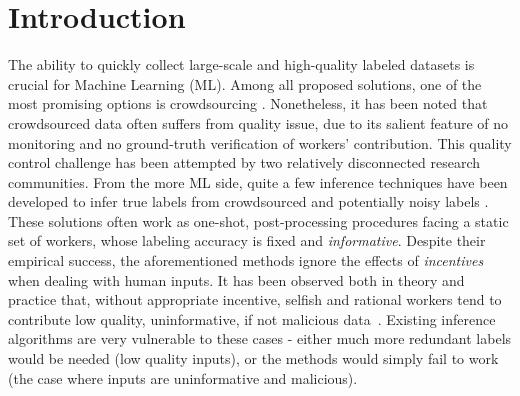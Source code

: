 \documentclass{article}
\begin{document}
\section{Introduction}
The ability to quickly collect large-scale and high-quality labeled datasets is crucial for Machine Learning (ML). Among all proposed solutions, one of the most promising options is crowdsourcing \cite{Howe2006,slivkins2014online,difallah2015dynamics,simpson2015language}. Nonetheless, it has been noted that crowdsourced data often suffers from quality issue, due to its salient feature of no monitoring and no ground-truth verification of workers' contribution. This quality control challenge has been attempted by two relatively disconnected research communities. From the more ML side, quite a few inference techniques have been developed to infer true labels from crowdsourced and potentially noisy labels \cite{raykar2010learning,liu2012variational,zhou2014aggregating,zheng2017truth}. These solutions often work as one-shot, post-processing procedures facing a static set of workers, whose labeling accuracy is fixed and \emph{informative}.
Despite their empirical success, the aforementioned methods ignore the effects of \emph{incentives} when dealing with human inputs.
It has been observed both in theory and practice that, without appropriate incentive, selfish and rational workers tend to contribute low quality, uninformative, if not malicious data~\cite{sheng2008get,liu2017sequential}. Existing inference algorithms are very vulnerable to these cases - either much more redundant labels would be needed (low quality inputs), or the methods would simply fail to work (the case where inputs are uninformative and malicious). 
\end{document}
